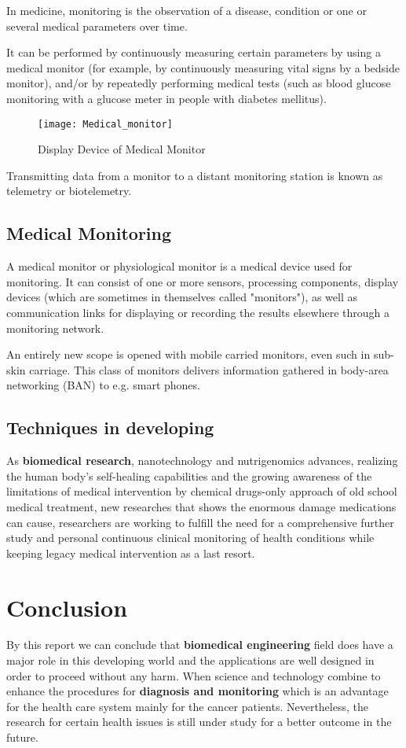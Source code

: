 \documentclass[12pt]{article}
\begin{document}
In medicine, monitoring is the observation of a disease, condition or one or several medical parameters over time.

It can be performed by continuously measuring certain parameters by using a medical monitor (for example, by continuously measuring vital signs by a bedside monitor), and/or by repeatedly performing medical tests (such as blood glucose monitoring with a glucose meter in people with diabetes mellitus).

\begin{figure}[ht]
\centering
\texttt{[image: Medical\_monitor]}
\caption{Display Device of Medical Monitor}
\end{figure}

Transmitting data from a monitor to a distant monitoring station is known as telemetry or biotelemetry.

\subsection{Medical Monitoring}

A medical monitor or physiological monitor is a medical device used for monitoring. It can consist of one or more sensors, processing components, display devices (which are sometimes in themselves called "monitors"), as well as communication links for displaying or recording the results elsewhere through a monitoring network.

An entirely new scope is opened with mobile carried monitors, even such in sub-skin carriage. This class of monitors delivers information gathered in body-area networking (BAN) to e.g. smart phones.

\subsection{Techniques in developing}

As {\bfseries biomedical research}, nanotechnology and nutrigenomics advances, realizing the human body's self-healing capabilities and the growing awareness of the limitations of medical intervention by chemical drugs-only approach of old school medical treatment, new researches that shows the enormous damage medications can cause, researchers are working to fulfill the need for a comprehensive further study and personal continuous clinical monitoring of health conditions while keeping legacy medical intervention as a last resort.

\section{Conclusion}

By this report we can conclude that {\bfseries biomedical engineering} field does have a major role in this developing world and the applications are well designed in order to proceed without any harm. When science and technology combine to enhance the procedures  for {\bfseries diagnosis  and monitoring} which is an  advantage for  the health care  system mainly  for the cancer  patients. Nevertheless, the research for certain health issues is still under study for a better outcome in the future.
\clearpage
\end{document}
